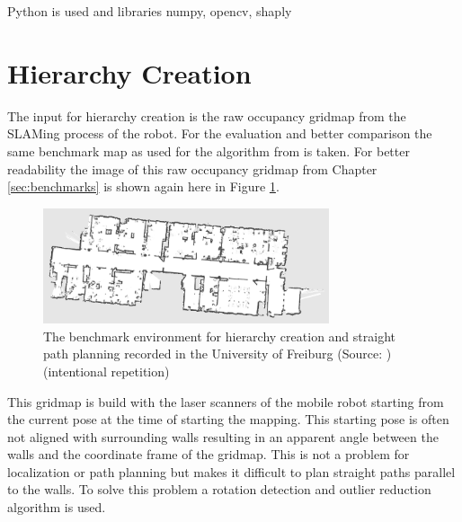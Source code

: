 Python is used and libraries numpy, opencv, shaply

\section{Hierarchy Creation}
\label{sec:hierarchy_creation}

The input for hierarchy creation is the raw occupancy gridmap from the SLAMing process of the robot. For the evaluation and better comparison the same benchmark map as used for the algorithm from \cite{ryu_hierarchical_2020} is taken. For better readability the image of this raw occupancy gridmap from Chapter \ref{sec:benchmarks} is shown again here in Figure \ref{fig:freiburg_benchmark_2}.

\begin{figure}[h]
    \centering
    \includegraphics[width=0.75\textwidth]{figures/30_methods/freiburg_benchmark.png}
    \caption[The benchmark environment for hierarchy creation and straight path planning (intentional repetition)]{The benchmark environment for hierarchy creation and straight path planning recorded in the University of Freiburg (Source: \cite{cyrill_stachniss_robotics_2015})(intentional repetition)}
    \label{fig:freiburg_benchmark_2}
\end{figure}

This gridmap is build with the laser scanners of the mobile robot starting from the current pose at the time of starting the mapping. This starting pose is often not aligned with surrounding walls resulting in an apparent angle between the walls and the coordinate frame of the gridmap. This is not a problem for localization or path planning but makes it difficult to plan straight paths parallel to the walls. To solve this problem a rotation detection and outlier reduction algorithm is used.

